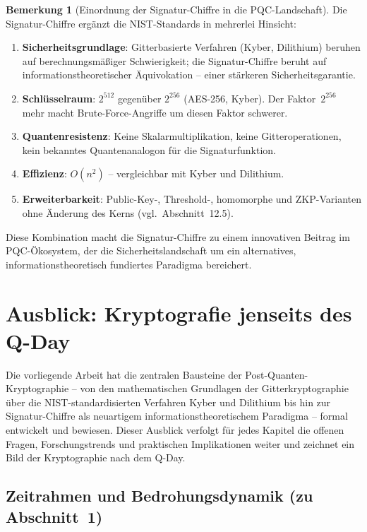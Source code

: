 ﻿\documentclass[a4paper,12pt]{article}
\theoremstyle{definition}
\newtheorem{bemerkung}{Bemerkung}[section]
\begin{document}
\begin{bemerkung}[Einordnung der Signatur-Chiffre in die PQC-Landschaft]
Die Signatur-Chiffre ergänzt die NIST-Standards in mehrerlei Hinsicht:
\begin{enumerate}
\item \textbf{Sicherheitsgrundlage}: Gitterbasierte Verfahren (Kyber, Dilithium)
  beruhen auf berechnungsmäßiger Schwierigkeit; die Signatur-Chiffre beruht
  auf informationstheoretischer Äquivokation -- einer stärkeren Sicherheitsgarantie.
\item \textbf{Schlüsselraum}: $2^{512}$ gegenüber $2^{256}$ (AES-256, Kyber).
  Der Faktor~$2^{256}$ mehr macht Brute-Force-Angriffe um diesen Faktor schwerer.
\item \textbf{Quantenresistenz}: Keine Skalarmultiplikation, keine Gitteroperationen,
  kein bekanntes Quantenanalogon für die Signaturfunktion.
\item \textbf{Effizienz}: $O(n^2)$ -- vergleichbar mit Kyber und Dilithium.
\item \textbf{Erweiterbarkeit}: Public-Key-, Threshold-, homomorphe und
  ZKP-Varianten ohne Änderung des Kerns (vgl.\ Abschnitt~12.5).
\end{enumerate}
Diese Kombination macht die Signatur-Chiffre \cite{Epp26b} zu einem
innovativen Beitrag im PQC-Ökosystem, der die Sicherheitslandschaft
um ein alternatives, informationstheoretisch fundiertes Paradigma bereichert.
\end{bemerkung}

\section{Ausblick: Kryptografie jenseits des Q-Day}

Die vorliegende Arbeit hat die zentralen Bausteine der Post-Quanten-Kryptographie
-- von den mathematischen Grundlagen der Gitterkryptographie über die
NIST-standardisierten Verfahren Kyber und Dilithium bis hin zur
Signatur-Chiffre als neuartigem informationstheoretischem Paradigma --
formal entwickelt und bewiesen. Dieser Ausblick verfolgt für jedes
Kapitel die offenen Fragen, Forschungstrends und praktischen Implikationen
weiter und zeichnet ein Bild der Kryptographie nach dem Q-Day.

\subsection{Zeitrahmen und Bedrohungsdynamik (zu Abschnitt~1)}
\end{document}
